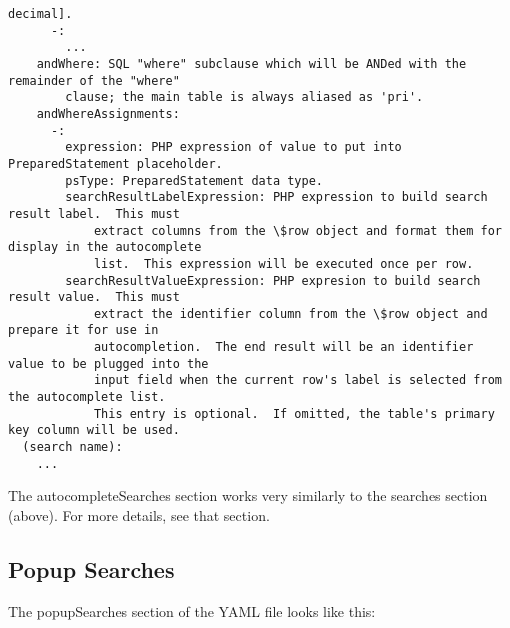 \documentclass[letterpaper,10pt,english]{sphinxmanual}
\begin{document}
\begin{Verbatim}[commandchars=\\\{\}]
            decimal].
      -:
        ...
    andWhere: SQL "where" subclause which will be ANDed with the remainder of the "where"
        clause; the main table is always aliased as 'pri'.
    andWhereAssignments:
      -:
        expression: PHP expression of value to put into PreparedStatement placeholder.
        psType: PreparedStatement data type.
        searchResultLabelExpression: PHP expression to build search result label.  This must
            extract columns from the \$row object and format them for display in the autocomplete
            list.  This expression will be executed once per row.
        searchResultValueExpression: PHP expresion to build search result value.  This must
            extract the identifier column from the \$row object and prepare it for use in
            autocompletion.  The end result will be an identifier value to be plugged into the
            input field when the current row's label is selected from the autocomplete list.
            This entry is optional.  If omitted, the table's primary key column will be used.
  (search name):
    ...
\end{Verbatim}

The autocompleteSearches section works very similarly to the searches section (above).  For more
details, see that section.


\subsection{Popup Searches}
\label{jaxFrameworkGuide:popup-searches}
The popupSearches section of the YAML file looks like this:
\end{document}
